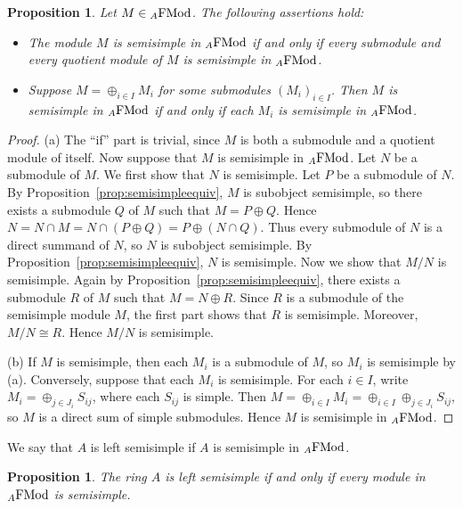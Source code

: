 \documentclass[12pt]{amsart}
\newtheorem{prop}[thm]{Proposition}
\theoremstyle{definition}
\newcommand{\FMod}{{\rm FMod}}
\begin{document}
\begin{prop}\label{prop:semisimpledirectsum}
Let $M \in {}_A\FMod$. The following 
assertions hold:
\begin{itemize}[widest=(a)]

\item[{\rm (a)}] The module $M$ is 
semisimple in ${}_A\FMod$
if and only if every submodule and 
every quotient
module of $M$ is semisimple in ${}_A\FMod$.

\item[{\rm (b)}] Suppose 
$M = \oplus_{i \in I} M_i$
for some submodules $(M_i)_{i \in I}$. 
Then $M$ is 
semisimple in ${}_A\FMod$ 
if and only if each $M_i$
is semisimple in ${}_A\FMod$.

\end{itemize}
\end{prop}

\begin{proof}
(a) The ``if'' part is trivial, since $M$ is both a submodule and a quotient module of itself.
Now suppose that $M$ is semisimple in ${}_A\FMod$.
Let $N$ be a submodule of $M$.
We first show that $N$ is semisimple.
Let $P$ be a submodule of $N$.
By Proposition~\ref{prop:semisimpleequiv}, $M$ is subobject semisimple, so there exists a submodule $Q$ of $M$ such that
$M = P\oplus Q$. Hence
$N = N\cap M = N\cap (P\oplus Q) = P\oplus (N\cap Q)$.
Thus every submodule of $N$ is a direct summand of $N$, so $N$ is subobject semisimple.
By Proposition~\ref{prop:semisimpleequiv}, $N$ is semisimple.
Now we show that $M/N$ is semisimple.
Again by Proposition~\ref{prop:semisimpleequiv}, 
there exists a submodule $R$ of $M$ such that
$M = N \oplus R$.
Since $R$ is a submodule of the semisimple module $M$, 
the first part shows that $R$ is semisimple.
Moreover, $M/N \cong R$. Hence $M/N$ is semisimple.

(b)
If $M$ is semisimple, then each $M_i$ is a submodule of $M$, 
so $M_i$ is semisimple by (a).
Conversely, suppose that each $M_i$ is semisimple.
For each $i\in I$, write
$M_i = \oplus_{j\in J_i} S_{ij}$,
where each $S_{ij}$ is simple. Then
$M = \oplus_{i\in I} M_i
= \oplus_{i\in I} \oplus_{j\in J_i} S_{ij}$,
so $M$ is a direct sum of simple submodules.
Hence $M$ is semisimple in ${}_A\FMod$.
\end{proof}

We say that $A$ is left semisimple 
if $A$ is semisimple in ${}_A \FMod$.

\begin{prop}\label{prop:Asemisimpleprojective}
The ring $A$ is left semisimple if and only if 
every module in ${}_A \FMod$ is semisimple.
\end{prop}
\end{document}
